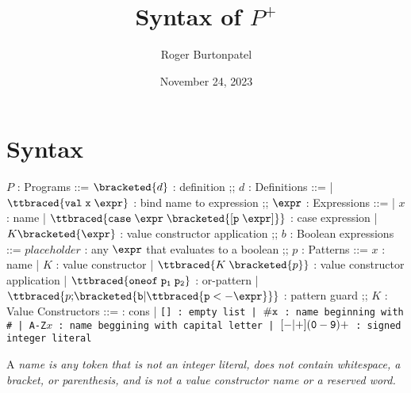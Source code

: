 \documentclass[]{article}
\title{Syntax of $P^{+}$}
\author{Roger Burtonpatel}
\date{November 24, 2023}
\begin{document}
\maketitle

\newcommand\la{\langle}
\newcommand\ra{\rangle}
\def\<#1>{\synt{#1}}

\newcommand\B[1]{\synt{#1}}

\section{Syntax}

\bigskip 
\begin{center}
    \begin{bnf}

    $P$ : \textsf{Programs} ::=
    $\bracketed{d}$ : definition
    ;;
    $d$ : \textsf{Definitions} ::=
    | $\ttbraced{\tt{val}\; x\; \expr}$ : bind name to expression
    ;;
    $\expr$ : \textsf{Expressions} ::=
    | $x$ : name
    | $\ttbraced{\tt{case}\; \expr\; \bracketed{\tt{[} p\; \expr \tt{]}}}$ : case expression 
    | $K \bracketed{\expr}$ : value constructor application 
    ;;
    $b$ : Boolean expressions ::=
     $\mathit{placeholder}$ : any $\expr$ that evaluates to a boolean 
    ;;
    $p$ : \textsf{Patterns} ::= $x$ : name 
    | $K$ : value constructor 
    | $\ttbraced{K\; \bracketed{p}}$ : value constructor application 
    | $\ttbraced{\tt{oneof}\; p_{1}\;  p_{2} }$ : or-pattern 
    | $\ttbraced{p \tt{;} \bracketed{b \vert \ttbraced{p  <- \expr}}}$ : pattern guard
    ;;
    $K$ : \textsf{Value Constructors} ::=
    \cons : cons 
    | \tt{[]} : empty list 
    | $\tt{\#}x$ : name beginning with \tt{\#}
    | \tt{A-Z}$x$ : name beggining with capital letter
    | $[\tt{-}\vert\tt{+}](\tt{0}-\tt{9})+$ : signed integer literal 

    \end{bnf}
\end{center}
\bigskip 

A \it{name} is any token that is not an integer literal, 
does not contain whitespace, a bracket, or parenthesis, 
and is not a value constructor name or a reserved word.

\bigskip

\end{document}
